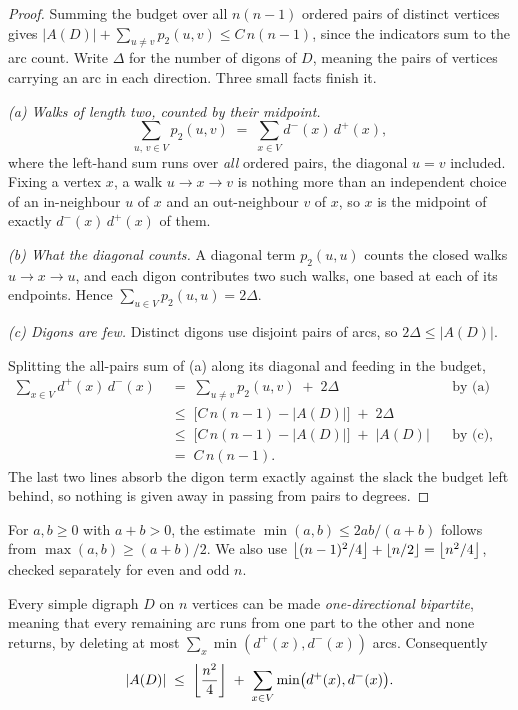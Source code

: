 \begin{proof}
Summing the budget over all $n(n-1)$ ordered pairs of distinct vertices gives $|A(D)| + \sum_{u \ne v} p_2(u,v) \le C\,n(n-1)$, since the indicators sum to the arc count. Write $\Delta$ for the number of digons of $D$, meaning the pairs of vertices carrying an arc in each direction. Three small facts finish it.

\emph{(a) Walks of length two, counted by their midpoint.}
\[
    \sum_{u,\,v \in V} p_2(u,v) \;=\; \sum_{x \in V} d^-(x)\,d^+(x),
\]
where the left-hand sum runs over \emph{all} ordered pairs, the diagonal $u = v$ included. Fixing a vertex $x$, a walk $u \to x \to v$ is nothing more than an independent choice of an in-neighbour $u$ of $x$ and an out-neighbour $v$ of $x$, so $x$ is the midpoint of exactly $d^-(x)\,d^+(x)$ of them.

\emph{(b) What the diagonal counts.} A diagonal term $p_2(u,u)$ counts the closed walks $u \to x \to u$, and each digon contributes two such walks, one based at each of its endpoints. Hence $\sum_{u \in V} p_2(u,u) = 2\Delta$.

\emph{(c) Digons are few.} Distinct digons use disjoint pairs of arcs, so $2\Delta \le |A(D)|$.

Splitting the all-pairs sum of (a) along its diagonal and feeding in the budget,
\[
\begin{aligned}
    \sum_{x \in V} d^+(x)\,d^-(x)
      &\;=\; \sum_{u \ne v} p_2(u,v) \;+\; 2\Delta
      &&\text{by (a) and (b),} \\[2pt]
      &\;\le\; \bigl[C\,n(n-1) - |A(D)|\bigr] \;+\; 2\Delta
      && \\[2pt]
      &\;\le\; \bigl[C\,n(n-1) - |A(D)|\bigr] \;+\; |A(D)|
      &&\text{by (c),} \\[2pt]
      &\;=\; C\,n(n-1).
\end{aligned}
\]
The last two lines absorb the digon term exactly against the slack the budget left behind, so nothing is given away in passing from pairs to degrees.
\end{proof}

For $a,b\ge0$ with $a+b>0$, the estimate
$\min(a,b)\le2ab/(a+b)$ follows from $\max(a,b)\ge(a+b)/2$.
We also use
$\left\lfloor (n-1)^2/4 \right\rfloor+\left\lfloor n/2 \right\rfloor=\left\lfloor n^2/4 \right\rfloor$, checked separately for even
and odd $n$.

\begin{lemma}\label{lem:smaller-half-deletion}
Every simple digraph $D$ on $n$ vertices can be made \emph{one-directional bipartite}, meaning that every remaining arc runs from one part to the other and none returns, by deleting at most $\sum_{x} \min(d^+(x), d^-(x))$ arcs. Consequently
\[
    |A(D)| \;\le\; \left\lfloor \frac{n^2}{4} \right\rfloor \;+\; \sum_{x \in V} \min\bigl(d^+(x), d^-(x)\bigr) .
\]
\end{lemma}

